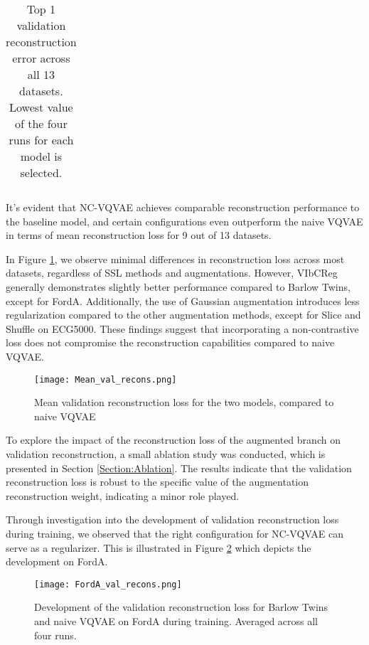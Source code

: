\documentclass[../../thesis.tex]{subfiles}
\begin{document}
\begin{table}[H]
\begin{adjustbox}{width=\textwidth}
\begin{tabular}{lc|c|c|c|c|c|c}
  
        \bottomrule
    \end{tabular}
    \end{adjustbox}
    \caption{Top 1 validation reconstruction error across all 13 datasets. Lowest value of the four runs for each model is selected.}
    \label{tab:best_recons}
\end{table}

It's evident that NC-VQVAE achieves comparable reconstruction performance to the baseline model, and certain configurations even outperform the naive VQVAE in terms of mean reconstruction loss for 9 out of 13 datasets.\newline

In Figure \ref{fig:Mean_val_recons}, we observe minimal differences in reconstruction loss across most datasets, regardless of SSL methods and augmentations. However, VIbCReg generally demonstrates slightly better performance compared to Barlow Twins, except for FordA. Additionally, the use of Gaussian augmentation introduces less regularization compared to the other augmentation methods, except for Slice and Shuffle on ECG5000. These findings suggest that incorporating a non-contrastive loss does not compromise the reconstruction capabilities compared to naive VQVAE. \newline

\begin{figure}[h]
    \texttt{[image: Mean\_val\_recons.png]}
    \centering  
    \caption{Mean validation reconstruction loss for the two models, compared to naive VQVAE}
    \label{fig:Mean_val_recons}
\end{figure}

To explore the impact of the reconstruction loss of the augmented branch on validation reconstruction, a small ablation study was conducted, which is presented in Section \ref{Section:Ablation}. The results indicate that the validation reconstruction loss is robust to the specific value of the augmentation reconstruction weight, indicating a minor role played.\newline

Through investigation into the development of validation reconstruction loss during training, we observed that the right configuration for NC-VQVAE can serve as a regularizer. This is illustrated in Figure \ref{fig:FordA_val_recons} which depicts the development on FordA. 

\begin{figure}[h]
    \texttt{[image: FordA\_val\_recons.png]}
    \centering  
    \caption{Development of the validation reconstruction loss for Barlow Twins and naive VQVAE on FordA during training. Averaged across all four runs. }
    \label{fig:FordA_val_recons}
\end{figure}
\end{document}
